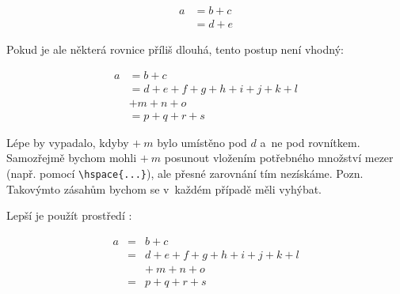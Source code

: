 \begin{example}
\begin{align}
  a & = b + c \\
    & = d + e
\end{align}
\end{example}

Pokud je ale některá rovnice příliš dlouhá, tento postup není vhodný:
\begin{example}
\begin{align}
  a & = b + c \\
    & = d + e + f + g + h +
        i + j + k + l\nonumber\\
    & + m + n + o \\
    & = p + q + r + s
\end{align}
\end{example}
\noindent
Lépe by vypadalo, kdyby $+\:m$ bylo umístěno pod $d$ a~ne pod rovnítkem.
Samozřejmě bychom mohli $+\:m$ posunout  vložením potřebného
množství mezer (např. pomocí \verb+\hspace{...}+), ale přesné zarovnání
tím nezískáme. Pozn. Takovýmto  zásahům bychom se v~každém případě
měli vyhýbat.

Lepší je použít prostředí :
\begin{example}
\begin{eqnarray}
  a & = & b + c \\
    & = & d + e + f + g + h +
    i + j + k + l \nonumber \\
    &   & +\: m + n + o\\
    & = & p + q + r + s
\end{eqnarray}
\end{example}

